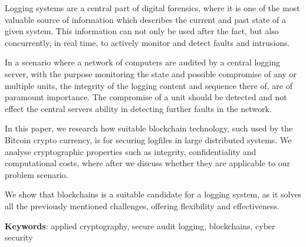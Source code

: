 
Logging systems are a central part of digital forensics, where it
is one of the most valuable source of information which describes
the current and past state of a given system. This information
can not only be used after the fact, but also concurrently, in
real time, to actively monitor and detect faults and intrusions.

In a scenario where a network of computers are audited by a
central logging server, with the purpose monitoring the state and
possible compromise of any or multiple units, the integrity of
the logging content and sequence there of, are of paramount
importance. The compromise of a unit should be detected and not
effect the central servers ability in detecting further faults
in the network.

In this paper, we research how suitable blockchain technology, such
used by the Bitcoin crypto currency, is for securing logfiles in large
distributed systems. We analyse cryptographic properties such as
integrity, confidentiality and computational costs, where after we
discuss whether they are applicable to our problem scenario.

We show that blockchains is a suitable candidate for a logging system,
as it solves all the previously mentioned challenges, offering
flexibility and effectiveness.

\textbf{Keywords}: applied cryptography, secure audit logging,
blockchains, cyber security
